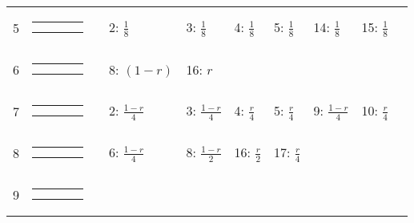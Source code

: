 \begin{center}
\begin{tabular}{ccclllllll}
5 &
{\renewcommand{\arraystretch}{0.3}
\renewcommand{\tabcolsep}{0.5mm}
\parbox[b][3mm][c]{12mm}{
\begin{tabular}{|p{2mm}|p{2mm}||p{2mm}|p{2mm}|} \hline
$\bullet$ &           & $\bullet$ &           \\
          & $\bullet$ &           & $\circ  $ \\ \hline
\end{tabular}}}
&
& 2: $\frac{1}{8}$
& 3: $\frac{1}{8}$
& 4: $\frac{1}{8}$
& 5: $\frac{1}{8}$
& 14: $\frac{1}{8}$
& 15: $\frac{1}{8}$
& \\
6 &
{\renewcommand{\arraystretch}{0.3}
\renewcommand{\tabcolsep}{0.5mm}
\parbox[b][3mm][c]{12mm}{
\begin{tabular}{|p{2mm}|p{2mm}||p{2mm}|p{2mm}|} \hline
$\bullet$ &           &           &           \\
$\bullet$ & $\circ  $ &           &           \\ \hline
\end{tabular}}}
&
& 8: $(1-r)$
& 16: $r$
& & & & & \\
7 &
{\renewcommand{\arraystretch}{0.3}
\renewcommand{\tabcolsep}{0.5mm}
\parbox[b][3mm][c]{12mm}{
\begin{tabular}{|p{2mm}|p{2mm}||p{2mm}|p{2mm}|} \hline
$\bullet$ & $\bullet$ &           &           \\
$\bullet$ &           & $\circ  $ &           \\ \hline
\end{tabular}}}
&
& 2: $\frac{1-r}{4}$
& 3: $\frac{1-r}{4}$
& 4: $\frac{r}{4}$
& 5: $\frac{r}{4}$
& 9: $\frac{1-r}{4}$
& 10: $\frac{r}{4}$
& \\
8 &
{\renewcommand{\arraystretch}{0.3}
\renewcommand{\tabcolsep}{0.5mm}
\parbox[b][3mm][c]{12mm}{
\begin{tabular}{|p{2mm}|p{2mm}||p{2mm}|p{2mm}|} \hline
$\bullet$ &           &           &           \\
$\bullet$ &           & $\circ  $ &           \\ \hline
\end{tabular}}}
&
& 6: $\frac{1-r}{4}$
& 8: $\frac{1-r}{2}$
& 16: $\frac{r}{2}$
& 17: $\frac{r}{4}$
& & & \\
9 &
{\renewcommand{\arraystretch}{0.3}
\renewcommand{\tabcolsep}{0.5mm}
\parbox[b][3mm][c]{12mm}{
\begin{tabular}{|p{2mm}|p{2mm}||p{2mm}|p{2mm}|} \hline
$\bullet$ &           & $\bullet$ &           \\
$\bullet$ & $\circ  $ &           &           \\ \hline

\end{tabular}}}
\end{tabular}
\end{center}
